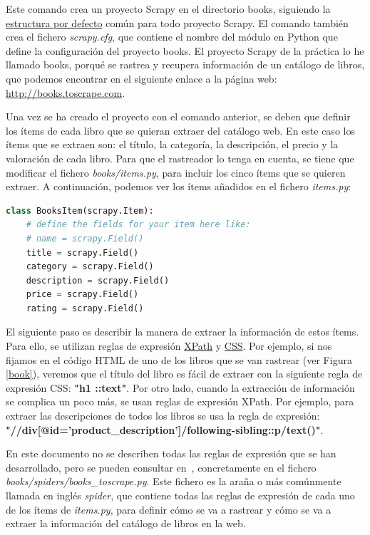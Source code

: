 \documentclass{uimppracticas}
\begin{document}
Este comando crea un proyecto Scrapy en el directorio books, siguiendo la \href{https://docs.scrapy.org/en/latest/topics/commands.html#default-structure-of-scrapy-projects}{estructura por defecto} común para todo proyecto Scrapy. El comando también crea el fichero \textit{scrapy.cfg}, que contiene el nombre del módulo en Python que define la configuración del proyecto books. El proyecto Scrapy de la práctica lo he llamado books, porqué se rastrea y recupera información de un catálogo de libros, que podemos encontrar en el siguiente enlace a la página web: \url{http://books.toscrape.com}.

Una vez se ha creado el proyecto con el comando anterior, se deben que definir los ítems de cada libro que se quieran extraer del catálogo web. En este caso los ítems que se extraen son: el título, la categoría, la descripción, el precio y la valoración de cada libro. Para que el rastreador lo tenga en cuenta, se tiene que modificar el fichero \textit{books/items.py}, para incluir los cinco ítems que se quieren extraer. A continuación, podemos ver los ítems añadidos en el fichero \textit{items.py}:

\begin{lstlisting}[language=python, basicstyle=\small]
class BooksItem(scrapy.Item):
	# define the fields for your item here like:
	# name = scrapy.Field()
	title = scrapy.Field()
	category = scrapy.Field()
	description = scrapy.Field()
	price = scrapy.Field()
	rating = scrapy.Field()
\end{lstlisting}

El siguiente paso es describir la manera de extraer la información de estos ítems. Para ello, se utilizan reglas de expresión \href{https://www.w3.org/TR/xpath/all/}{XPath} y \href{https://www.w3.org/TR/selectors/}{CSS}. Por ejemplo, si nos fijamos en el código HTML de uno de los libros que se van rastrear (ver Figura \ref{book}), veremos que el título del libro es fácil de extraer con la siguiente regla de expresión CSS: \textbf{"h1 ::text"}. Por otro lado, cuando la extracción de información se complica un poco más, se usan reglas de expresión XPath. Por ejemplo, para extraer las descripciones de todos los libros se usa la regla de expresión: \textbf{"//div[@id='product\_description']/following-sibling::p/text()"}. 

En este documento no se describen todas las reglas de expresión que se han desarrollado, pero se pueden consultar en~\cite{GitHubRepo}, concretamente en el fichero \textit{books/spiders/books\_toscrape.py}. Este fichero es la araña o más comúnmente llamada en inglés \textit{spider}, que contiene todas las reglas de expresión de cada uno de los ítems de \textit{items.py}, para definir cómo se va a rastrear y cómo se va a extraer la información del catálogo de libros en la web.
\end{document}
